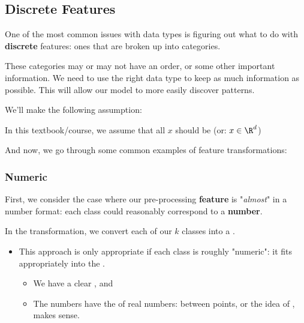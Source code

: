         \subsection*{Discrete Features}

            One of the most common issues with data types is figuring out what to do with \textbf{discrete} features: ones that are broken up into categories.

            These categories may or may not have an order, or some other important information. We need to use the right data type to keep as much information as possible. This will allow our model to more easily discover patterns.

            We'll make the following assumption:\\

            \begin{clarification}
                In this textbook/course, we assume that all  $x$ should be  (or: $x \in \R^d$)
            \end{clarification}


            And now, we go through some common examples of feature transformations:

            \subsubsection*{Numeric}

                First, we consider the case where our pre-processing \textbf{feature} is "\textit{almost}" in a number format: each class could reasonably correspond to a \textbf{number}.\\
    
                \begin{definition}
                    In the  transformation, we convert each of our $k$ classes into a . 
    
                    \begin{itemize}
                        \item This approach is only appropriate if each class is roughly "numeric": it fits appropriately into the .
                            \begin{itemize}
                                \item We have a clear , and
                                \item The numbers have the  of real numbers:  between points, or the idea of , makes sense.
                            \end{itemize}
                    \end{itemize}
                \end{definition}


